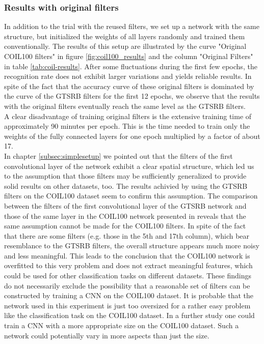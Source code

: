 \documentclass[11pt, a4paper]{article}
\begin{document}
\subsubsection{Results with original filters}

In addition to the trial with the reused filters, we set up a network with the same structure, but initialized the weights of all layers randomly and trained them conventionally. The results of this setup are illustrated by the curve "Original COIL100 filters" in figure \ref{fig:coil100_results} and the column "Original Filters" in table \ref{tab:coil-results}. After some fluctuations during the first few epochs, the recognition rate does not exhibit larger variations and yields reliable results. In spite of the fact that the accuracy curve of these original filters is dominated by the curve of the GTSRB filters for the first 12 epochs, we observe that the results with the original filters eventually reach the same level as the GTSRB filters.\\
A clear disadvantage of training original filters is the extensive training time of approximately 90 minutes per epoch. This is the time needed to train only the weights of the fully connected layers for one epoch multiplied by a factor of about 17.\\
In chapter \ref{subsec:simplesetup} we pointed out that the filters of the first convolutional layer of the  network exhibit a clear spatial structure, which led us to the assumption that those filters may be sufficiently generalized to provide solid results on other datasets, too. The results achivied by using the GTSRB filters on the COIL100 dataset seem to confirm this assumption. The comparison between the filters of the first convolutional layer of the GTSRB network and those of the same layer in the COIL100 network presented in  reveals that the same assumption cannot be made for the COIL100 filters. In spite of the fact that there are some filters (e.g. those in the 5th and 17th column), which bear resemblance to the GTSRB filters, the overall structure appears much more noisy and less meaningful. This leads to the conclusion that the COIL100 network is overfitted to this very problem and does not extract meaningful features, which could be used for other classification tasks on different datasets. These findings do not necessarily exclude the possibility that a reasonable set of filters can be constructed by training a CNN on the COIL100 dataset. It is probable that the network used in this experiment is just too oversized for a rather easy problem like the classification task on the COIL100 dataset. In a further study one could train a CNN with a more appropriate size on the COIL100 dataset. Such a network could potentially vary in more aspects than just the size.\\
\end{document}
